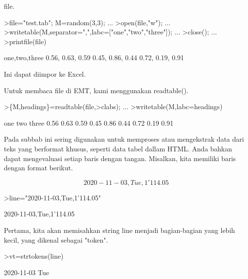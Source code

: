 \documentclass[a4paper,10pt]{article}
\begin{document}
\begin{eulernotebook}
\begin{eulercomment}
\begin{eulercomment}
\begin{eulercomment}
\begin{eulercomment}
\begin{eulercomment}
\begin{eulercomment}
\begin{eulercomment}
\begin{eulercomment}
\begin{eulercomment}
\begin{eulercomment}
\begin{eulercomment}
\begin{eulercomment}
\begin{eulercomment}
\begin{eulercomment}
\begin{eulercomment}
file.
\end{eulercomment}
\begin{eulerprompt}
>file="test.tab"; M=random(3,3);  ...
>open(file,"w");  ...
>writetable(M,separator=",",labc=["one","two","three"]);  ...
>close(); ...
>printfile(file)
\end{eulerprompt}
\begin{euleroutput}
  one,two,three
        0.56,      0.63,      0.59
        0.45,      0.86,      0.44
        0.72,      0.19,      0.91
\end{euleroutput}
\begin{eulercomment}
Ini dapat diimpor ke Excel.

Untuk membaca file di EMT, kami menggunakan readtable().
\end{eulercomment}
\begin{eulerprompt}
>\{M,headings\}=readtable(file,>clabs); ...
>writetable(M,labc=headings)
\end{eulerprompt}
\begin{euleroutput}
         one       two     three
        0.56      0.63      0.59
        0.45      0.86      0.44
        0.72      0.19      0.91
\end{euleroutput}
\begin{eulercomment}
Pada subbab ini sering digunakan untuk memproses atau mengekstrak data
dari teks yang berformat khusus, seperti data tabel dallam HTML. Anda
bahkan dapat mengevaluasi setiap baris dengan tangan. Misalkan, kita
memiliki baris dengan format berikut.\\
\end{eulercomment}
\begin{eulerformula}
\[
2020-11-03, Tue, 1'114.05
\]
\end{eulerformula}
\begin{eulerprompt}
>line="2020-11-03,Tue,1'114.05"
\end{eulerprompt}
\begin{euleroutput}
  2020-11-03,Tue,1'114.05
\end{euleroutput}
\begin{eulercomment}
Pertama, kita akan memisahkan string line menjadi bagian-bagian yang
lebih kecil, yang dikenal sebagai "token".
\end{eulercomment}
\begin{eulerprompt}
>vt=strtokens(line)
\end{eulerprompt}
\begin{euleroutput}
  2020-11-03
  Tue

\end{euleroutput}
\end{eulercomment}
\end{eulercomment}
\end{eulercomment}
\end{eulercomment}
\end{eulercomment}
\end{eulercomment}
\end{eulercomment}
\end{eulercomment}
\end{eulercomment}
\end{eulercomment}
\end{eulercomment}
\end{eulercomment}
\end{eulercomment}
\end{eulercomment}
\end{eulernotebook}
\end{document}

